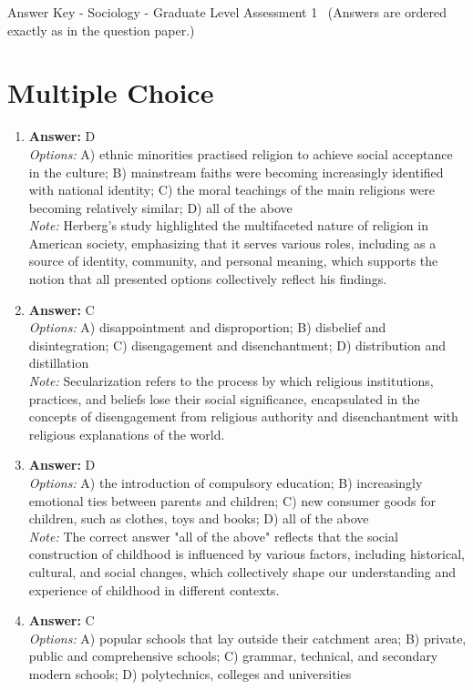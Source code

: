 \documentclass[12pt]{article}
\begin{document}
\begin{center}
Answer Key - Sociology - Graduate Level Assessment 1 \
\small (Answers are ordered exactly as in the question paper.)
\end{center}

\section*{Multiple Choice}
\begin{enumerate}[label=\arabic*.]
\item \textbf{Answer:} D
\\ \textit{Options:} A) ethnic minorities practised religion to achieve social acceptance in the culture; B) mainstream faiths were becoming increasingly identified with national identity; C) the moral teachings of the main religions were becoming relatively similar; D) all of the above
\\ \textit{Note:} Herberg's study highlighted the multifaceted nature of religion in American society, emphasizing that it serves various roles, including as a source of identity, community, and personal meaning, which supports the notion that all presented options collectively reflect his findings.
\item \textbf{Answer:} C
\\ \textit{Options:} A) disappointment and disproportion; B) disbelief and disintegration; C) disengagement and disenchantment; D) distribution and distillation
\\ \textit{Note:} Secularization refers to the process by which religious institutions, practices, and beliefs lose their social significance, encapsulated in the concepts of disengagement from religious authority and disenchantment with religious explanations of the world.
\item \textbf{Answer:} D
\\ \textit{Options:} A) the introduction of compulsory education; B) increasingly emotional ties between parents and children; C) new consumer goods for children, such as clothes, toys and books; D) all of the above
\\ \textit{Note:} The correct answer "all of the above" reflects that the social construction of childhood is influenced by various factors, including historical, cultural, and social changes, which collectively shape our understanding and experience of childhood in different contexts.
\item \textbf{Answer:} C
\\ \textit{Options:} A) popular schools that lay outside their catchment area; B) private, public and comprehensive schools; C) grammar, technical, and secondary modern schools; D) polytechnics, colleges and universities

\end{enumerate}
\end{document}
